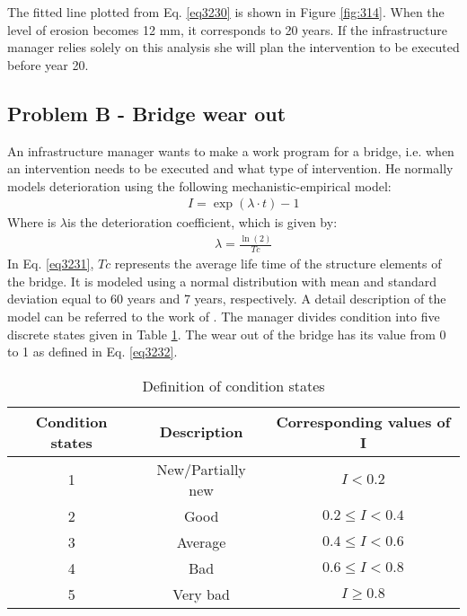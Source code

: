 The fitted line plotted from Eq. \eqref{eq3230} is shown in Figure \ref{fig:314}. When the level of erosion becomes 12 mm, it corresponds to 20 years. If the infrastructure manager relies solely on this analysis she will plan the intervention to be executed before year 20.
\subsection{Problem B - Bridge wear out}
An infrastructure manager wants to make a work program for a bridge, i.e. when an intervention needs to be executed and what type of intervention. He normally models deterioration using the following mechanistic-empirical model:
\begin{eqnarray}
 && I = \exp (\lambda  \cdot t) - 1 \label{eq3231}
\end{eqnarray}
Where is $\lambda $is the deterioration coefficient, which is given by:
\begin{eqnarray}
 && \lambda  = \frac{{\ln (2)}}{{Tc}} \label{eq3232}
\end{eqnarray}
In Eq. \eqref{eq3231}, $Tc$ represents the average life time of the structure elements of the bridge. It is modeled using a normal distribution with mean and standard deviation equal to 60 years and 7 years, respectively. A detail description of the model can be referred to the work of \cite{Brodsky2006}. The manager divides condition into five discrete states given in Table \ref{tbl:37}. The wear out of the bridge has its value from 0 to 1 as defined in Eq. \eqref{eq3232}.
\begin{table}
	\caption{Definition of condition states} \label{tbl:37}
\begin{tabular}{|l|l|l|}
\hline
\multicolumn{1}{|c|}{Condition states} & \multicolumn{1}{c|}{Description} & \multicolumn{1}{c|}{Corresponding values of I} \\ 
\hline
\multicolumn{1}{|c|}{1} & \multicolumn{1}{c|}{New/Partially new} & \multicolumn{1}{c|}{$I<0.2$} \\ 
\hline
\multicolumn{1}{|c|}{2} & \multicolumn{1}{c|}{Good} & \multicolumn{1}{c|}{$0.2\le I <0.4$} \\ 
\hline
\multicolumn{1}{|c|}{3} & \multicolumn{1}{c|}{Average} & \multicolumn{1}{c|}{$0.4\le I <0.6$} \\ 
\hline
\multicolumn{1}{|c|}{4} & \multicolumn{1}{c|}{Bad} & \multicolumn{1}{c|}{$0.6\le I <0.8$} \\ 
\hline
\multicolumn{1}{|c|}{5} & \multicolumn{1}{c|}{Very bad} & \multicolumn{1}{c|}{$I\ge0.8$}\\
\hline
\end{tabular}
\end{table}
